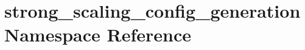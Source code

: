 \hypertarget{namespacestrong__scaling__config__generation}{}\section{strong\+\_\+scaling\+\_\+config\+\_\+generation Namespace Reference}
\label{namespacestrong__scaling__config__generation}
